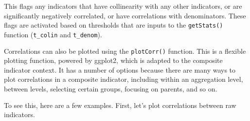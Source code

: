 \documentclass[
]{book}
\newenvironment{Shaded}{\begin{snugshade}}{\end{snugshade}}
\newcommand{\DecValTok}[1]{\textcolor[rgb]{0.00,0.00,0.81}{#1}}
\newcommand{\DocumentationTok}[1]{\textcolor[rgb]{0.56,0.35,0.01}{\textbf{\textit{#1}}}}
\newcommand{\FunctionTok}[1]{\textcolor[rgb]{0.00,0.00,0.00}{#1}}
\newcommand{\NormalTok}[1]{#1}
\newcommand{\SpecialCharTok}[1]{\textcolor[rgb]{0.00,0.00,0.00}{#1}}
\newcommand{\StringTok}[1]{\textcolor[rgb]{0.31,0.60,0.02}{#1}}
\begin{document}
\begin{Shaded}
\end{Shaded}

This flags any indicators that have collinearity with any other indicators, or are significantly negatively correlated, or have correlations with denominators. These flags are activated based on thresholds that are inputs to the \texttt{getStats()} function (\texttt{t\_colin} and \texttt{t\_denom}).

Correlations can also be plotted using the \texttt{plotCorr()} function. This is a flexible plotting function, powered by ggplot2, which is adapted to the composite indicator context. It has a number of options because there are many ways to plot correlations in a composite indicator, including within an aggregation level, between levels, selecting certain groups, focusing on parents, and so on.

To see this, here are a few examples. First, let's plot correlations between raw indicators.
\end{document}
